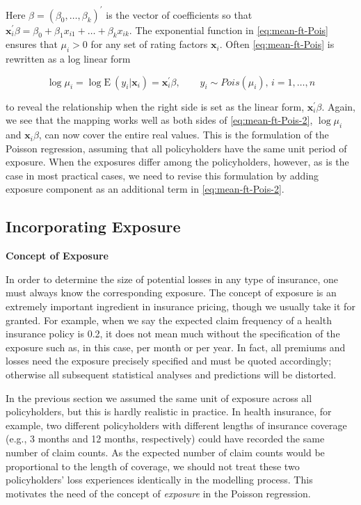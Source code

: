 \documentclass[]{book}
\theoremstyle{definition}
\theoremstyle{definition}
\theoremstyle{definition}
\theoremstyle{remark}
\begin{document}
Here \(\beta=(\beta_0, \ldots, \beta_k)^{\prime}\) is the vector of
coefficients so that
\(\mathbf{ x}^{\prime}_i\beta=\beta_0+\beta_1x_{i1} +\ldots+\beta_k x_{ik}\).
The exponential function in \eqref{eq:mean-ft-Pois} ensures that
\(\mu_i >0\) for any set of rating factors \(\mathbf{ x}_i\). Often
\eqref{eq:mean-ft-Pois} is rewritten as a log linear form

\begin{equation}
\log \mu_i=\log \mathrm{E~}{(y_i|\mathbf{ x}_i)}=\mathbf{ x}^{\prime}_i\beta, \qquad y_i \sim Pois(\mu_i), \, i=1, \ldots, n
\label{eq:mean-ft-Pois-2}
\end{equation}

to reveal the relationship when the right side is set as the linear
form, \(\mathbf{ x}^{\prime}_i\beta\). Again, we see that the mapping
works well as both sides of \eqref{eq:mean-ft-Pois-2}, \(\log \mu_i\) and
\(\mathbf{ x}_i\beta\), can now cover the entire real values. This is
the formulation of the Poisson regression, assuming that all
policyholders have the same unit period of exposure. When the exposures
differ among the policyholders, however, as is the case in most
practical cases, we need to revise this formulation by adding exposure
component as an additional term in \eqref{eq:mean-ft-Pois-2}.

\subsection{Incorporating Exposure}\label{incorporating-exposure}

\textbf{Concept of Exposure}

In order to determine the size of potential losses in any type of
insurance, one must always know the corresponding exposure. The concept
of exposure is an extremely important ingredient in insurance pricing,
though we usually take it for granted. For example, when we say the
expected claim frequency of a health insurance policy is 0.2, it does
not mean much without the specification of the exposure such as, in this
case, per month or per year. In fact, all premiums and losses need the
exposure precisely specified and must be quoted accordingly; otherwise
all subsequent statistical analyses and predictions will be distorted.

In the previous section we assumed the same unit of exposure across all
policyholders, but this is hardly realistic in practice. In health
insurance, for example, two different policyholders with different
lengths of insurance coverage (e.g., 3 months and 12 months,
respectively) could have recorded the same number of claim counts. As
the expected number of claim counts would be proportional to the length
of coverage, we should not treat these two policyholders' loss
experiences identically in the modelling process. This motivates the
need of the concept of \emph{exposure} in the Poisson regression.
\end{document}
